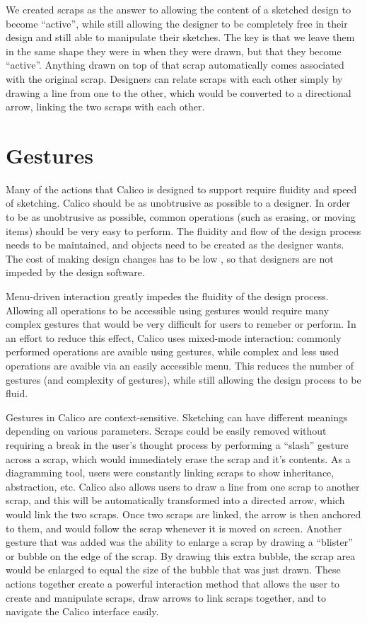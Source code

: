 We created scraps as the answer to allowing the content of a sketched design to become ``active'', while still allowing the designer to be completely free in their design and still able to manipulate their sketches.
The key is that we leave them in the same shape they were in when they were drawn, but that they become ``active''. 
Anything drawn on top of that scrap automatically comes associated with the original scrap.
Designers can relate scraps with each other simply by drawing a line from one to the other, which would be converted to a directional arrow, linking the two scraps with each other.



\section{Gestures}
Many of the actions that Calico is designed to support require fluidity and speed of sketching. Calico should be as unobtrusive as possible to a designer. In order to be as unobtrusive as possible, common operations (such as erasing, or moving items) should be very easy to perform. The fluidity and flow of the design process needs to be maintained, and objects need to be created as the designer wants. The cost of making design changes has to be low \cite{design_fluidity}, so that designers are not impeded by the design software.

Menu-driven interaction greatly impedes the fluidity of the design process. Allowing all operations to be accessible using gestures would require many complex gestures that would be very difficult for users to remeber or perform. In an effort to reduce this effect, Calico uses mixed-mode interaction: commonly performed operations are avaible using gestures, while complex and less used operations are avaible via an easily accessible menu. This reduces the number of gestures (and complexity of gestures), while still allowing the design process to be fluid.

Gestures in Calico are context-sensitive. Sketching can have different meanings depending on various parameters. Scraps could be easily removed without requiring a break in the user's thought process by performing a ``slash'' gesture across a scrap, which would immediately erase the scrap and it's contents.
As a diagramming tool, users were constantly linking scraps to show inheritance, abstraction, etc.
Calico also allows users to draw a line from one scrap to another scrap, and this will be automatically transformed into a directed arrow, which would link the two scraps.
Once two scraps are linked, the arrow is then anchored to them, and would follow the scrap whenever it is moved on screen.
Another gesture that was added was the ability to enlarge a scrap by drawing a ``blister'' or bubble on the edge of the scrap.
By drawing this extra bubble, the scrap area would be enlarged to equal the size of the bubble that was just drawn. These actions together create a powerful interaction method that allows the user to create and manipulate scraps, draw arrows to link scraps together, and to navigate the Calico interface easily. 

